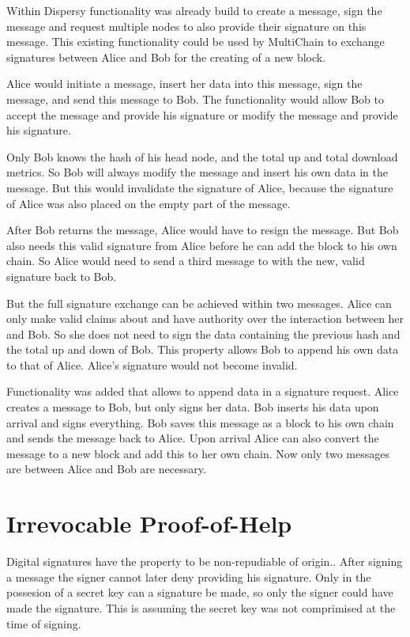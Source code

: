 Within Dispersy functionality was already build to create a message, sign the message
and request multiple nodes to also provide their signature on this message.
This existing functionality could be used by MultiChain to exchange signatures
between Alice and Bob for the creating of a new block.

Alice would initiate a message, insert her data into this message, sign the message, and send this message to Bob.
The functionality would allow Bob to accept the message and provide his signature or
modify the message and provide his signature.

Only Bob knows the hash of his head node, and the total up and total download metrics.
So Bob will always modify the message and insert his own data in the message.
But this would invalidate the signature of Alice,
because the signature of Alice was also placed on the empty part of the message.

After Bob returns the message,
Alice would have to resign the message.
But Bob also needs this valid signature from Alice before he can add the block to his own chain.
So Alice would need to send a third message to with the new, valid signature back to Bob.

But the full signature exchange can be achieved within two messages.
Alice can only make valid claims about and have authority over the interaction between her and Bob.
So she does not need to sign the data containing the previous hash and the total up and down of Bob.
This property allows Bob to append his own data to that of Alice.
Alice's signature would not become invalid.

Functionality was added that allows to append data in a signature request.
Alice creates a message to Bob, but only signs her data.
Bob inserts his data upon arrival and signs everything.
Bob saves this message as a block to his own chain
and sends the message back to Alice.
Upon arrival Alice can also convert the message to a new block and add this to her own chain.
Now only two messages are between Alice and Bob are necessary.

\section{Irrevocable Proof-of-Help}
Digital signatures have the property to be non-repudiable of origin.\cite{VanderLubbe-crypto}.
After signing a message the signer cannot later deny providing his signature.
Only in the possesion of a secret key can a signature be made,
so only the signer could have made the signature.
This is assuming the secret key was not comprimised at the time of signing.

